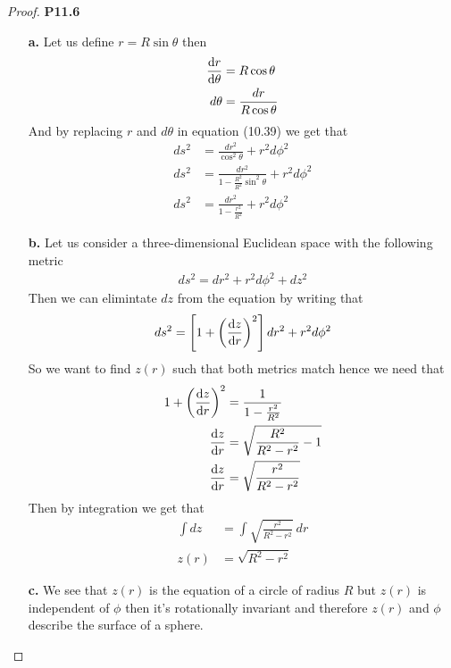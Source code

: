 \documentclass[11pt]{article}
\theoremstyle{definition}
\begin{document}
\begin{proof}{\textbf{P11.6}}
\begin{itemize}
    \item [\textbf{a.}] Let us define $r = R\sin\theta$ then
    \begin{align*}
        \dv{r}{\theta} &= R\cos\theta\\
        d\theta &= \frac{dr}{R\cos\theta}
    \end{align*}
    And by replacing $r$ and $d\theta$ in equation (10.39) we get that
    \begin{align*}
        ds^2 &= \frac{dr^2}{\cos^2\theta} + r^2d\phi^2\\
        ds^2 &= \frac{dr^2}{1 - \frac{R^2}{R^2}\sin^2\theta} + r^2d\phi^2\\
        ds^2 &= \frac{dr^2}{1 - \frac{r^2}{R^2}} + r^2d\phi^2
    \end{align*}
    \item [\textbf{b.}] Let us consider a three-dimensional Euclidean space
    with the following metric 
    \begin{align*}
        ds^2 = dr^2 + r^2d\phi^2 + dz^2
    \end{align*}
    Then we can elimintate $dz$ from the equation by writing that
    \begin{align*}
        ds^2 = \left[1 +\left(\dv{z}{r}\right)^2\right]dr^2 + r^2d\phi^2
    \end{align*}
    So we want to find $z(r)$ such that both metrics match hence we need that
    \begin{align*}
        1 +\left(\dv{z}{r}\right)^2 &= \frac{1}{1 - \frac{r^2}{R^2}}\\
        \dv{z}{r} &= \sqrt{\frac{R^2}{R^2 - r^2} - 1}\\
        \dv{z}{r} &= \sqrt{\frac{r^2}{R^2 - r^2}}
    \end{align*}
    Then by integration we get that
    \begin{align*}
        \int dz &= \int \sqrt{\frac{r^2}{R^2 - r^2}}~dr\\
        z(r) &= \sqrt{R^2 - r^2}
    \end{align*}
    \item [\textbf{c.}] We see that $z(r)$ is the equation of a circle of
    radius $R$ but $z(r)$ is independent of $\phi$ then it's rotationally
    invariant and therefore $z(r)$ and $\phi$ describe the surface of a
    sphere.
\end{itemize}
\end{proof}
\cleardoublepage
\end{document}
